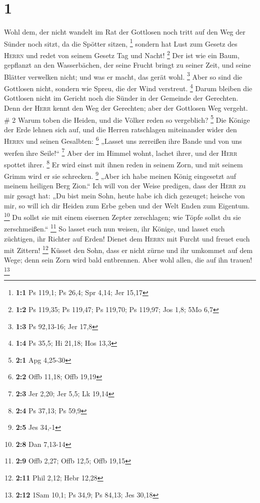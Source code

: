 \hypertarget{section}{%
\section{1}\label{section}}

 Wohl dem, der nicht wandelt im Rat der Gottlosen noch
tritt auf den Weg der Sünder noch sitzt, da die Spötter sitzen,
\footnote{\textbf{1:1} Ps 119,1; Ps 26,4; Spr 4,14; Jer 15,17}
 sondern hat Lust zum Gesetz des \textsc{Herrn} und redet
von seinem Gesetz Tag und Nacht! \footnote{\textbf{1:2} Ps 119,35; Ps
  119,47; Ps 119,70; Ps 119,97; Jos 1,8; 5Mo 6,7}  Der ist
wie ein Baum, gepflanzt an den Wasserbächen, der seine Frucht bringt zu
seiner Zeit, und seine Blätter verwelken nicht; und was er macht, das
gerät wohl. \footnote{\textbf{1:3} Ps 92,13-16; Jer 17,8} 
Aber so sind die Gottlosen nicht, sondern wie Spreu, die der Wind
verstreut. \footnote{\textbf{1:4} Ps 35,5; Hi 21,18; Hos 13,3}
 Darum bleiben die Gottlosen nicht im Gericht noch die
Sünder in der Gemeinde der Gerechten.  Denn der
\textsc{Herr} kennt den Weg der Gerechten; aber der Gottlosen Weg
vergeht. \# 2  Warum toben die Heiden, und die Völker
reden so vergeblich? \footnote{\textbf{2:1} Apg 4,25-30} 
Die Könige der Erde lehnen sich auf, und die Herren ratschlagen
miteinander wider den \textsc{Herrn} und seinen Gesalbten: \footnote{\textbf{2:2}
  Offb 11,18; Offb 19,19}  „Lasset uns zerreißen ihre
Bande und von uns werfen ihre Seile!{}`` \footnote{\textbf{2:3} Jer
  2,20; Jer 5,5; Lk 19,14}  Aber der im Himmel wohnt,
lachet ihrer, und der \textsc{Herr} spottet ihrer. \footnote{\textbf{2:4}
  Ps 37,13; Ps 59,9}  Er wird einst mit ihnen reden in
seinem Zorn, und mit seinem Grimm wird er sie schrecken. \footnote{\textbf{2:5}
  Jes 34,-1}  „Aber ich habe meinen König eingesetzt auf
meinem heiligen Berg Zion.``  Ich will von der Weise
predigen, dass der \textsc{Herr} zu mir gesagt hat: „Du bist mein Sohn,
heute habe ich dich gezeuget;  heische von mir, so will
ich dir Heiden zum Erbe geben und der Welt Enden zum Eigentum.
\footnote{\textbf{2:8} Dan 7,13-14}  Du sollst sie mit
einem eisernen Zepter zerschlagen; wie Töpfe sollst du sie
zerschmeißen.`` \footnote{\textbf{2:9} Offb 2,27; Offb 12,5; Offb 19,15}
 So lasset euch nun weisen, ihr Könige, und lasset euch
züchtigen, ihr Richter auf Erden!  Dienet dem
\textsc{Herrn} mit Furcht und freuet euch mit Zittern! \footnote{\textbf{2:11}
  Phil 2,12; Hebr 12,28}  Küsset den Sohn, dass er nicht
zürne und ihr umkommet auf dem Wege; denn sein Zorn wird bald
entbrennen. Aber wohl allen, die auf ihn trauen! \footnote{\textbf{2:12}
  1Sam 10,1; Ps 34,9; Ps 84,13; Jes 30,18}

